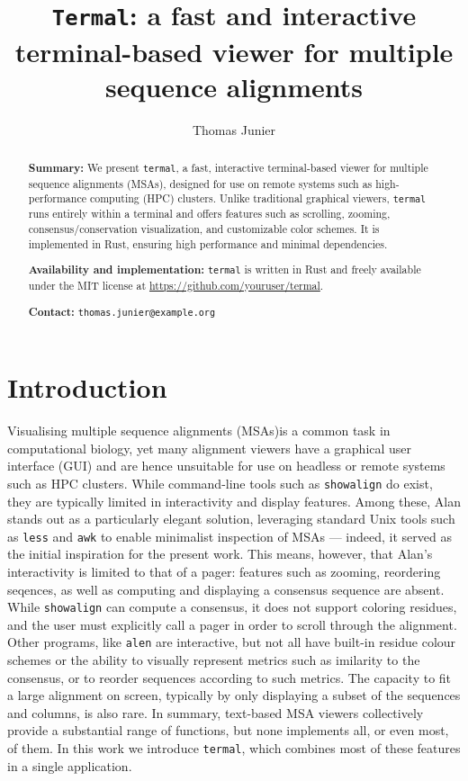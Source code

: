 \documentclass[11pt]{article}
\title{%
\texttt{Termal}: a fast and interactive terminal-based viewer for multiple sequence alignments
}
\author[1]{Thomas Junier}
\affil[1]{Swiss Institute of Bioinformatics, Vital-\textsc{it} Group, Switzerland\\
\texttt{thomas.junier@sib.swiss}}
\date{} %
\begin{document}
\maketitle

\begin{abstract} \textbf{Summary:} We present \texttt{termal}, a fast,
  interactive terminal-based viewer for multiple sequence alignments (MSAs),
  designed for use on remote systems such as high-performance computing (HPC)
  clusters. Unlike traditional graphical viewers, \texttt{termal} runs entirely
  within a terminal and offers features such as scrolling, zooming,
  consensus/conservation visualization, and customizable color schemes. It is
  implemented in Rust, ensuring high performance and minimal dependencies.

  \textbf{Availability and implementation:} \texttt{termal} is written in Rust
  and freely available under the MIT license at
  \url{https://github.com/youruser/termal}.

\textbf{Contact:} \texttt{thomas.junier@example.org}
\end{abstract}

\section*{Introduction}

Visualising multiple sequence alignments (MSAs)is a common task in computational
biology, yet many alignment viewers have a graphical user interface (GUI) and
are hence unsuitable for use on headless or remote systems such as HPC clusters.
While command-line tools such as \texttt{showalign}\cite{emboss} do exist, they
are typically limited in interactivity and display features. Among these,
Alan\cite{alan} stands out as a particularly elegant solution, leveraging
standard Unix tools such as \texttt{less} and \texttt{awk} to enable minimalist
inspection of MSAs ---  indeed, it served as the initial inspiration for the
present work. This means, however, that Alan's interactivity is limited to that
of a pager: features such as zooming, reordering seqences, as well as computing
and displaying a consensus sequence are absent. While \texttt{showalign} can
compute a consensus, it does not support coloring residues, and the user must
explicitly call a pager in order to scroll through the alignment. Other
programs, like \texttt{alen}\cite{alen} are interactive, but not all have
built-in residue colour schemes or the ability to visually represent metrics
such as imilarity to the consensus, or to reorder sequences according to such
metrics. The capacity to fit a large alignment on screen, typically by only
displaying a subset of the sequences and columns, is also rare. In summary,
text-based MSA viewers collectively provide a substantial range of functions,
but none implements all, or even most, of them. In this work we introduce
\texttt{termal}, which combines most of these features in a single application.
\end{document}
